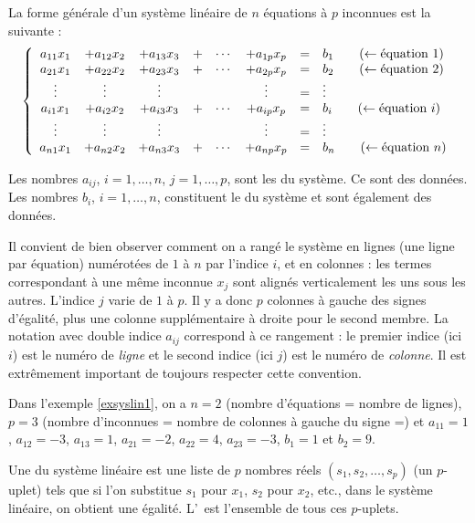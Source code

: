 \documentclass[class=report,crop=false]{standalone}
\begin{document}
La forme générale d'un système linéaire de $n$ équations à $p$ inconnues est la suivante :
$$\left\{
\begin{array}{cccccccl}
 a_{11}x_1 & +a_{12}x_2  &+a_{13}x_3&+&\cdots&+a_{1p}x_p&=&b_1 \qquad
(\leftarrow\hbox{équation  $1$})   \\
 a_{21}x_1 & +a_{22}x_2  &+a_{23}x_3&+&\cdots&+a_{2p}x_p&=&b_2 \qquad
(\leftarrow\hbox{équation  $2$})  \\
 \vdots &  \vdots  & \vdots&&& \vdots&=& \vdots   \\
 a_{i1}x_1 & +a_{i2}x_2  &+a_{i3}x_3&+&\cdots&+a_{ip}x_p&=&b_i \qquad
(\leftarrow\hbox{équation  $i$}) \\
 \vdots &  \vdots  & \vdots&&& \vdots&=& \vdots   \\
 a_{n1}x_1 & +a_{n2}x_2  &+a_{n3}x_3&+&\cdots&+a_{np}x_p&=&b_n \qquad
(\leftarrow\hbox{équation  $n$})  \\
   \end{array}
\right.
$$

Les nombres $a_{ij}$, $i=1,\ldots, n$, $j=1,\ldots, p$, sont les  du système.
Ce sont des données. Les nombres $b_{i}$, $i=1,\ldots, n$, constituent le
 du système et sont également des données.

Il convient de bien observer comment on a rangé le système en lignes
(une ligne par équation) numérotées de $1$ à $n$ par l'indice $i$, et en colonnes :
les termes correspondant à une même inconnue $x_j$ sont alignés verticalement
les uns sous les autres. L'indice $j$ varie de $1$ à $p$. Il y a donc $p$ colonnes
à gauche des signes d'égalité, plus une colonne supplémentaire à droite pour le
second membre. La notation avec double indice $a_{ij}$ correspond à ce rangement :
le premier indice (ici $i$) est le numéro de \emph{ligne} et le second
indice (ici $j$) est le numéro de \emph{colonne}. Il est extrêmement important
de toujours respecter cette convention.

Dans l'exemple \ref{exsyslin1}, on a $n=2$ (nombre d'équations = nombre de lignes),
$p=3$ (nombre d'inconnues = nombre de colonnes à gauche du signe =) et
$a_{11}=1$, $a_{12}=-3$, $a_{13}=1$, $a_{21}=-2$, $a_{22}=4$, $a_{23}=-3$, $b_1=1$ et $b_2=9$.

\begin{definition}
Une  du système linéaire est une liste de
$p$ nombres réels $(s_1,s_2,\ldots,s_p)$ (un $p$-uplet) tels que si
l'on substitue $s_1$ pour $x_1$, $s_2$ pour $x_2$, etc., dans le système
linéaire, on obtient une égalité. L'\,
est l'ensemble de tous ces $p$-uplets.
\end{definition}
\end{document}
